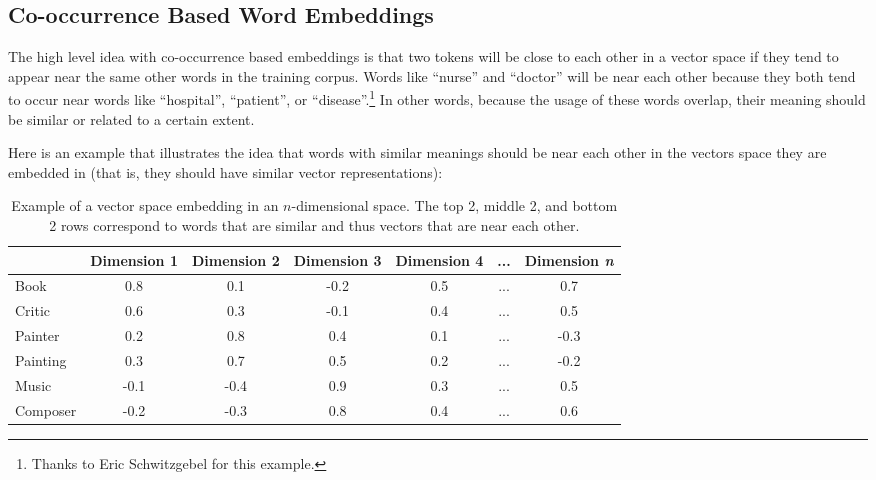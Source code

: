 \subsection{Co-occurrence Based Word Embeddings}


The high level idea with co-occurrence based embeddings is that two tokens will be close to each other in a vector space if they tend to appear near the same other words in the training corpus. Words like ``nurse'' and ``doctor'' will be near each other because they both tend to occur near words like ``hospital'', ``patient'', or ``disease''.\footnote{Thanks to Eric Schwitzgebel for this example.} In other words, because the usage of these words overlap, their meaning should be similar or related to a certain extent. 

Here is an example that illustrates the idea that words with similar meanings should be near each other in the vectors space they are embedded in (that is, they should have similar vector representations):
\begin{table}[h]
    \centering
    \begin{tabular}{|l|c|c|c|c|c|c|}
    \hline
     & Dimension 1 & Dimension 2 & Dimension 3 & Dimension 4 & ... & Dimension \textit{n} \\
    \hline
    Book    & 0.8 & 0.1 & -0.2 & 0.5 & ... & 0.7  \\
    \hline
    Critic  & 0.6 & 0.3 & -0.1 & 0.4 & ... & 0.5  \\
    \hline
    Painter & 0.2 & 0.8 & 0.4 & 0.1 & ... & -0.3 \\
    \hline
    Painting& 0.3 & 0.7 & 0.5 & 0.2 & ... & -0.2  \\
    \hline
    Music   & -0.1 & -0.4 & 0.9 & 0.3 & ... & 0.5  \\
    \hline
    Composer& -0.2 & -0.3 & 0.8 & 0.4 & ... & 0.6 \\
    \hline
    \end{tabular}
    \caption{Example of a vector space embedding in an $n$-dimensional space. The top 2, middle 2, and bottom 2 rows correspond to words that are similar and thus vectors that are near each other.}
    \label{exampleEmbeddings}
\end{table}

